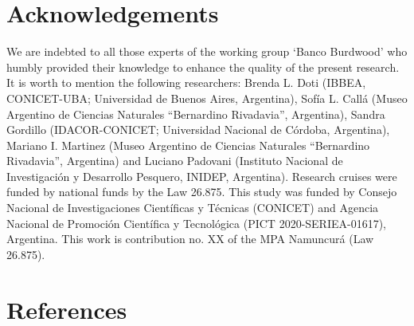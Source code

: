 \documentclass[preprint, 3p,
authoryear]{elsarticle} %
\begin{document}
\hypertarget{acknowledgements}{%
\section{Acknowledgements}\label{acknowledgements}}

We are indebted to all those experts of the working group `Banco
Burdwood' who humbly provided their knowledge to enhance the quality of
the present research. It is worth to mention the following researchers:
Brenda L. Doti (IBBEA, CONICET-UBA; Universidad de Buenos Aires,
Argentina), Sofía L. Callá (Museo Argentino de Ciencias Naturales
``Bernardino Rivadavia'', Argentina), Sandra Gordillo (IDACOR-CONICET;
Universidad Nacional de Córdoba, Argentina), Mariano I. Martinez (Museo
Argentino de Ciencias Naturales ``Bernardino Rivadavia'', Argentina) and
Luciano Padovani (Instituto Nacional de Investigación y Desarrollo
Pesquero, INIDEP, Argentina). Research cruises were funded by national
funds by the Law 26.875. This study was funded by Consejo Nacional de
Investigaciones Científicas y Técnicas (CONICET) and Agencia Nacional de
Promoción Científica y Tecnológica (PICT 2020-SERIEA-01617), Argentina.
This work is contribution no. XX of the MPA Namuncurá (Law 26.875).

\hypertarget{references}{%
\section*{References}\label{references}}
\end{document}
